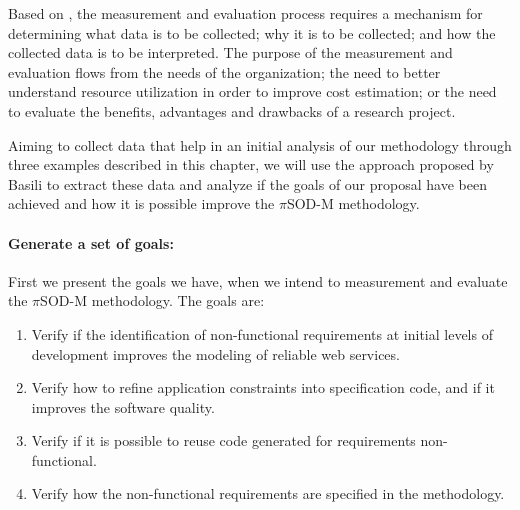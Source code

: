 \documentclass[runningheads,a4paper]{llncs}
\begin{document}
Based on \cite{basili:1985}, the measurement and evaluation process requires a
mechanism for determining what data is to be collected; why it is to be
collected; and how the collected data is to be interpreted. The purpose of the measurement and
evaluation flows from the needs of the organization; the need to better
understand resource utilization in order to improve cost estimation; or the need
to evaluate the benefits, advantages and drawbacks of a research project.

Aiming to collect data that help in an initial analysis of our methodology
through three examples described in this chapter, we will use the approach
proposed by Basili \cite{basili:1985} to extract these data and analyze if the goals of
our proposal have been achieved and how it is possible improve the $\pi$SOD-M
methodology. 
% 

\paragraph{Generate a set of goals:} First we present the goals we have, when we
intend to measurement and evaluate the $\pi$SOD-M methodology. The goals are:

% 

\begin{enumerate}
  \item  Verify if the identification of non-functional requirements at initial
  levels of development improves the modeling of reliable web services.
  

  \item  Verify how to refine application constraints into specification code,
  and if it improves the software quality.
  

  \item  Verify if it is possible to reuse code generated for requirements
non-functional.


  \item  Verify how the non-functional requirements are specified in the
  methodology.

\end{enumerate}
\end{document}

